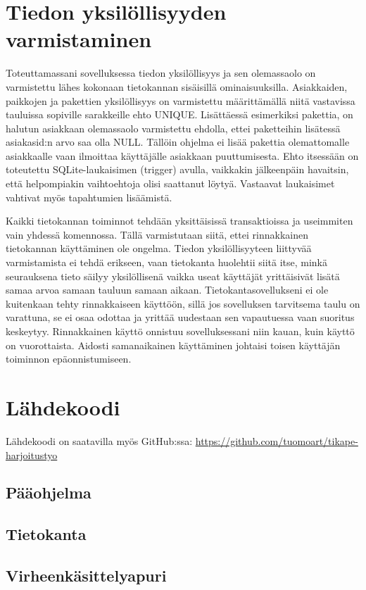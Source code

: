 \documentclass{scrartcl}
\begin{document}
\section{Tiedon yksilöllisyyden varmistaminen}

Toteuttamassani sovelluksessa tiedon yksilöllisyys ja sen olemassaolo on varmistettu lähes kokonaan tietokannan sisäisillä ominaisuuksilla. Asiakkaiden, paikkojen ja pakettien yksilöllisyys on varmistettu määrittämällä niitä vastavissa tauluissa sopiville sarakkeille ehto UNIQUE. Lisättäessä esimerkiksi pakettia, on halutun asiakkaan olemassaolo varmistettu ehdolla, ettei paketteihin lisätessä asiakas\textunderscore id:n arvo saa olla NULL. Tällöin ohjelma ei lisää pakettia olemattomalle asiakkaalle vaan ilmoittaa käyttäjälle asiakkaan puuttumisesta. Ehto itsessään on toteutettu SQLite-laukaisimen (trigger) avulla, vaikkakin jälkeenpäin havaitsin, että helpompiakin vaihtoehtoja olisi saattanut löytyä. Vastaavat laukaisimet vahtivat myös tapahtumien lisäämistä.

Kaikki tietokannan toiminnot tehdään yksittäisissä transaktioissa ja useimmiten vain yhdessä komennossa. Tällä varmistutaan siitä, ettei rinnakkainen tietokannan käyttäminen ole ongelma. Tiedon yksilöllisyyteen liittyvää varmistamista ei tehdä erikseen, vaan tietokanta huolehtii siitä itse, minkä seurauksena tieto säilyy yksilöllisenä vaikka useat käyttäjät yrittäisivät lisätä samaa arvoa samaan tauluun samaan aikaan. Tietokantasovellukseni ei ole kuitenkaan tehty rinnakkaiseen käyttöön, sillä jos sovelluksen tarvitsema taulu on varattuna, se ei osaa odottaa ja yrittää uudestaan sen vapautuessa vaan suoritus keskeytyy. Rinnakkainen käyttö onnistuu sovelluksessani niin kauan, kuin käyttö on vuorottaista. Aidosti samanaikainen käyttäminen johtaisi toisen käyttäjän toiminnon epäonnistumiseen.

\section{Lähdekoodi}

Lähdekoodi on saatavilla myös GitHub:ssa: \url{https://github.com/tuomoart/tikape-harjoitustyo}

\subsection{Pääohjelma}



\subsection{Tietokanta}



\subsection{Virheenkäsittelyapuri}


\end{document}
